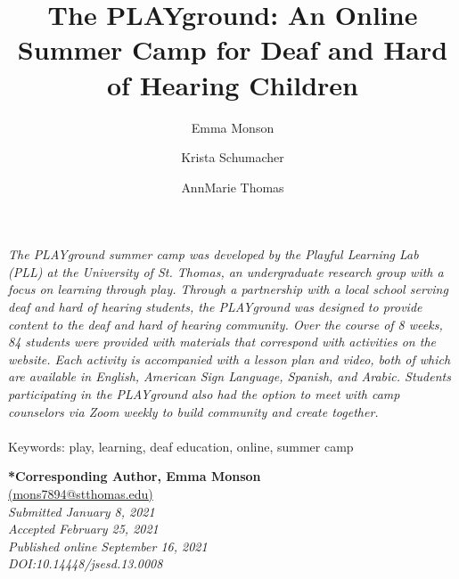 \documentclass[11.5pt]{sig-alternate}
\makeatletter
\let\oldabstract\abstract
\let\oldendabstract\endabstract
\renewenvironment{abstract}
{\renewenvironment{quotation}%
               {\list{}{\addtolength{\leftmargin}{1em} %
                        \listparindent 1.5em%
                        \itemindent    \listparindent%
                        \rightmargin   \leftmargin%
                        \parsep        \z@ \@plus\p@}%
                \item\relax}%
               {\endlist}%
\oldabstract}
{\oldendabstract}
\makeatother
\begin{document}
\title{The PLAYground: An Online Summer Camp for Deaf and Hard of Hearing Children}

\author[1]{\large \color{blue}Emma Monson}
\author[1]{\large \color{blue}Krista Schumacher}
\author[1]{\large \color{blue}AnnMarie Thomas}


\toappear{}
\maketitle
\begin{@twocolumnfalse} 
\begin{abstract}
\item 
 \textit {The PLAYground summer camp was developed by the Playful Learning Lab (PLL) at the University of St. Thomas, an undergraduate research group with a focus on learning through play. Through a partnership with a local school serving deaf and hard of hearing students, the PLAYground was designed to provide content to the deaf and hard of hearing community. Over the course of 8 weeks, 84 students were provided with materials that correspond with activities on the website. Each activity is accompanied with a lesson plan and video, both of which are available in English, American Sign Language, Spanish, and Arabic. Students participating in the PLAYground also had the option to meet with camp counselors via Zoom weekly to build community and create together.}
     \\
     \\
     Keywords: play, learning, deaf education, online, summer camp
\end{abstract}
\end{@twocolumnfalse}


\textbf{*Corresponding Author, Emma Monson}\\
\href{mailto: mons7894@stthomas.edu }{(mons7894@stthomas.edu)} \\
\textit{Submitted January 8, 2021 }\\
\textit{Accepted February 25, 2021} \\
\textit{Published online September 16, 2021} \\
\textit{DOI:10.14448/jsesd.13.0008} \\
\pagebreak
\pagebreak

\vspace{5mm}
\end{document}
